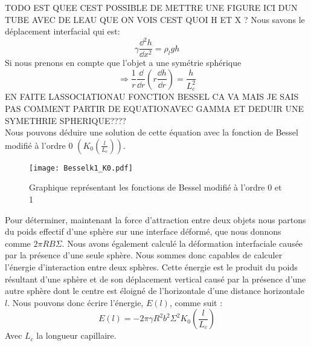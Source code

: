         TODO EST QUEE CEST POSSIBLE DE METTRE UNE FIGURE ICI DUN TUBE AVEC DE LEAU QUE ON VOIS CEST QUOI H ET X ?
        Nous savons le déplacement interfacial\cite{introfluidcambridge} qui est:
        \begin{equation}
            \gamma \frac{\dd^2h}{\dd x^2} = \rho_l g h
        \end{equation}
        Si nous prenons en compte que l'objet a une symétrie sphérique
        \begin{equation}
            \Rightarrow \frac{1}{r} \frac{\dd}{\dd r} \left( r\frac{\dd h}{\dd r}\right) = \frac{h}{L_c^2}
        \end{equation}
        EN FAITE LASSOCIATIONAU FONCTION BESSEL CA VA MAIS JE SAIS PAS COMMENT PARTIR DE EQUATIONAVEC GAMMA ET DEDUIR UNE SYMETHRIE SPHERIQUE????\\
        Nous pouvons déduire une solution de cette équation avec la fonction de Bessel modifié à l'ordre 0 \cite{introbessel} $(K_0\left(\frac{l}{L_c}\right))$.

        \begin{figure}[H]
            \centering
            \texttt{[image: Besselk1\_K0.pdf]}
            \caption{Graphique représentant les fonctions de Bessel modifié à l'ordre 0 et 1}
            \label{fig:bessel}
        \end{figure}

        Pour déterminer, maintenant la force d'attraction entre deux objets nous partons du poids effectif d'une sphère sur une interface déformé, que nous donnons comme \(2\pi RB\Sigma\). Nous avons également calculé la déformation interfaciale causée
        par la présence d'une seule sphère. Nous sommes donc capables de calculer l'énergie d'interaction entre deux sphères. Cette énergie est le produit du poids résultant d'une sphère et de son déplacement vertical causé par la présence d'une autre sphère dont le centre est éloigné de l'horizontale d'une distance horizontale $l$. Nous pouvons donc écrire l'énergie, $E(l)$, comme suit :
        \begin{equation}
            E(l)=-2\pi\gamma R^2b^2\Sigma^2K_0\left(\frac{l}{L_c}\right)
            \label{eq:energyInteraction}
        \end{equation}
        Avec $L_c$ la longueur capillaire.

